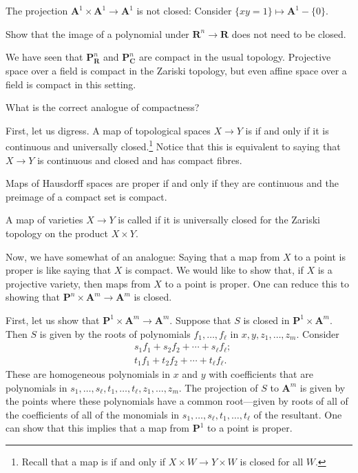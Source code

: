\documentclass [11 pt, oneside] {article}
\begin{document}
\begin{example}[ ]\label{}\text{}
The projection $\mathbf{A}^1\times \mathbf{A}^1 \longrightarrow \mathbf{A}^1$ is not closed: Consider $\{xy=1\}\longmapsto \mathbf{A}^1-\{0\}$.
\end{example}

\begin{exercise}\label{}\text{}
Show that the image of a polynomial under $\mathbf{R}^n\longrightarrow \mathbf{R}$ does not need to be closed.
\end{exercise}

We have seen that $\mathbf{P}^n_{\mathbf{R}}$ and $\mathbf{P}^n_{\mathbf{C}}$ are compact in the usual topology. Projective space over a field is compact in the Zariski topology, but even affine space over a field is compact in this setting.

\begin{problem}
	What is the correct analogue of compactness?
\end{problem}

First, let us digress. A map of topological spaces $X\longrightarrow Y$ is  if and only if it is continuous and universally closed.\footnote{Recall that a map is  if and only if $X\times W\longrightarrow Y\times W$ is closed for all $W$.} Notice that this is equivalent to saying that $X\longrightarrow Y$ is continuous and closed and has compact fibres.

Maps of Hausdorff spaces are proper if and only if they are continuous and the preimage of a compact set is compact.

A map of varieties $X\longrightarrow Y$ is called  if it is universally closed for the Zariski topology on the product $X\times Y$. 

Now, we have somewhat of an analogue: Saying that a map from $X$ to a point is proper is like saying that $X$ is compact. We would like to show that, if $X$ is a projective variety, then maps from $X$ to a point is proper. One can reduce this to showing that $\mathbf{P}^n\times \mathbf{A}^m\longrightarrow \mathbf{A}^m$ is closed.

First, let us show that $\mathbf{P}^1\times \mathbf{A}^m\longrightarrow \mathbf{A}^m$. Suppose that $S$ is closed in $\mathbf{P}^1\times \mathbf{A}^m$. Then $S$ is given by the roots of polynomials $f_1,\hdots, f_\ell$ in $x,y, z_1,\hdots,z_m$. Consider 
\begin{align*}
	&s_1f_1+s_2f_2+\cdots+s_\ell f_\ell;\\
	&t_1f_1+t_2f_2+\cdots+t_\ell f_\ell.
\end{align*}
These are homogeneous polynomials in $x$ and $y$ with coefficients that are polynomials in $s_1,\hdots,s_\ell,t_1,\hdots, t_\ell,z_1,\hdots, z_m$. The projection of $S$ to $\mathbf{A}^m$ is given by the points where these polynomials have a common root---given by roots of all of the coefficients of all of the monomials in $s_1,\hdots,s_\ell,t_1,\hdots, t_\ell$ of the resultant. One can show that this implies that a map from $\mathbf{P}^1$ to a point is proper.
\end{document}
